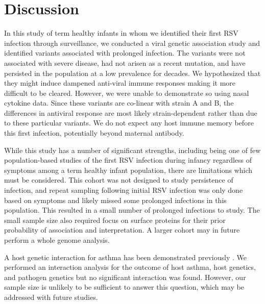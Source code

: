 \documentclass{article} %
\begin{document}
\section{Discussion}
In this study of term healthy infants in whom we identified their first RSV infection through surveillance, we conducted a viral genetic association study and identified variants associated with prolonged infection. 
The variants were not associated with severe disease, had not arisen as a recent mutation, and have persisted in the population at a low prevalence for decades.
We hypothesized that they might induce dampened anti-viral immune responses making it more difficult to be cleared. 
However, we were unable to demonstrate so using nasal cytokine data.
Since these variants are co-linear with strain A and B, the differences in antiviral response are most likely strain-dependent rather than due to these particular variants.
We do not expect any host immune memory before this first infection, potentially beyond maternal antibody.

While this study has a number of significant strengths, including being one of few population-based studies of the first RSV infection during infancy regardless of symptoms among a term healthy infant population, there are limitations which must be considered.
This cohort was not designed to study persistence of infection, and repeat sampling following initial RSV infection was only done based on symptoms and likely missed some prolonged infections in this population. 
This resulted in a small number of prolonged infections to study.
The small sample size also required focus on surface proteins for their prior probability of association and interpretation.
A larger cohort may in future perform a whole genome analysis.

A host genetic interaction for asthma has been demonstrated previously 
\cite{moffatt2010large}.
We performed an interaction analysis for the outcome of host asthma, host genetics, and pathogen genetics 
but no significant interaction was found. 
However, our sample size is unlikely to be sufficient to answer this question, 
which may be addressed with future studies. 
\end{document}
